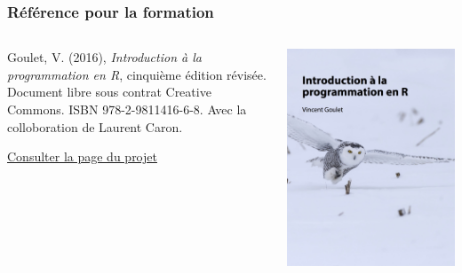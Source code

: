 \begin{frame}
  \frametitle{Référence pour la formation}

  \begin{columns}
    \begin{column}{.5\textwidth}
      Goulet, V. (2016), \emph{Introduction à la programmation en R},
      cinquième édition révisée. Document libre sous contrat Creative
      Commons. ISBN 978-2-9811416-6-8. Avec la colloboration de
      Laurent Caron.
      \bigskip

      \href{https://vigou3.github.io/introduction-programmation-r}{%
        Consulter la page du projet}
    \end{column}
    \begin{column}{.4\textwidth}
      \includegraphics[width=\linewidth,frame]{introduction-programmation-r}
    \end{column}
  \end{columns}
\end{frame}


